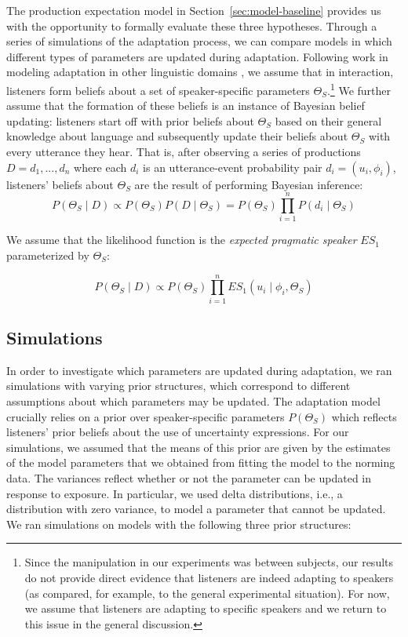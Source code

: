 \documentclass[man, floatsintext]{apa6}
\newcommand{\sectionref}[1]{Section~\ref{#1}}
\begin{document}
The production expectation model in \sectionref{sec:model-baseline} provides us with the opportunity to formally evaluate these three hypotheses.
Through a series of simulations of the adaptation process, we can compare models in which different types of parameters are
 updated during adaptation. Following work in modeling adaptation in other linguistic domains \parencite[e.g.,][]{Kleinschmidt2012,Kleinschmidt2015,Qing2014,Hawkins2017,Roettger2019}, 
we assume that in interaction, listeners form beliefs about a set of speaker-specific parameters $\Theta_S$.\footnote{Since the manipulation in our experiments was between subjects, our results do not provide direct evidence that listeners are indeed adapting to speakers (as compared, for example, to the general experimental situation). For now, we assume that listeners are adapting to specific speakers and we return to this issue in the general discussion.}
We further assume that the formation of these beliefs is an instance of Bayesian belief updating:
listeners start off with prior beliefs about $\Theta_S$ based on their general knowledge about 
language and subsequently update their beliefs about $\Theta_S$ with every utterance they hear. 
That is, after observing a series of productions $D={d_1, ..., d_n}$ where each $d_i$ is an 
utterance-event probability pair $d_i = (u_i, \phi_i)$, listeners' beliefs about $\Theta_S$ are the result
of performing Bayesian inference:
$$P(\Theta_S \mid D) \propto P(\Theta_S) P(D \mid \Theta_S) = P(\Theta_S) \prod_{i=1}^nP(d_i \mid \Theta_S) $$

\noindent We assume that the likelihood function is the \textit{expected pragmatic speaker} $ES_1$ parameterized by $\Theta_S$:

$$P(\Theta_S \mid D) \propto P(\Theta_S)  \prod_{i=1}^n ES_1(u_i \mid \phi_i, \Theta_S) $$



\subsection{Simulations}

In order to investigate which parameters are updated during adaptation, we ran simulations
with varying prior structures, which correspond to different assumptions about which parameters may be updated.
The adaptation model crucially relies on a prior over speaker-specific parameters $P(\Theta_S)$
which reflects listeners' prior beliefs about the use of uncertainty expressions. For our simulations,
we assumed that the means of this prior are given by the estimates of the model parameters that 
we obtained from fitting the model to the norming data. The variances reflect whether or not the parameter can be updated in response to exposure. In particular, we used delta distributions, i.e., a distribution with zero variance, to model a parameter that cannot be updated. We ran simulations on models with the following three prior structures:
\end{document}
